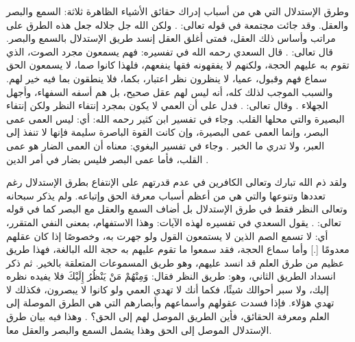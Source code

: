 وطرق الإستدلال التي هي من أسباب إدراك حقائق الأشياء الظاهرة ثلاثة: السمع والبصر والعقل. وقد جائت مجتمعة في قوله تعالى: \quranayah*[67][23]{\footnotesize \surahname*[67]}. ولكن الله جل جلاله جعل هذه الطرق على مراتب وأساس ذلك العقل، فمتى أغلق العقل إنسد طريق الإستدلال بالسمع والبصر. قال تعالى: 
\quranayah*[2][171]{\footnotesize \surahname*[2]}. قال السعدي رحمه الله في تفسيره: فهم يسمعون مجرد الصوت، الذي تقوم به عليهم الحجة، ولكنهم لا يفقهونه فقها ينفعهم، فلهذا كانوا صما، لا يسمعون الحق سماع فهم وقبول، عميا، لا ينظرون نظر اعتبار، بكما، فلا ينطقون بما فيه خير لهم. والسبب الموجب لذلك كله، أنه ليس لهم عقل صحيح، بل هم أسفه السفهاء، وأجهل الجهلاء \cite{tafsir_Saadi}. وقال تعالى: 
\quranayah*[22][46]{\footnotesize \surahname*[22]}. فدل على أن العمي لا يكون بمجرد إنتفاء النظر ولكن إنتفاء البصيرة والتي محلها القلب. وجاء في تفسير ابن كثير رحمه الله: أي: ليس العمى عمى البصر، وإنما العمى عمى البصيرة، وإن كانت القوة الباصرة سليمة فإنها لا تنفذ إلى العبر، ولا تدري ما الخبر \cite{tafsir_ibnKathir}. وجاء في تفسير البغوي: معناه أن العمى الضار هو عمى القلب، فأما عمى البصر فليس بضار في أمر الدين \cite{tafsir_Baghawi}. 

ولقد ذم الله تبارك وتعالى الكافرين في عدم قدرتهم على الإنتفاع بطرق الإستدلال رغم تعددها وتنوعها والتي هي من أعظم أسباب معرفة الحق وإتباعه. ولم يذكر سبحانه وتعالى النظر فقط في طرق الإستدلال بل أضاف السمع والعقل مع البصر كما في قوله تعالى: \quranayah*[10][42-43]{\footnotesize \surahname*[10]}. يقول السعدي في تفسيره لهذه الآيات: وهذا الاستفهام، بمعنى النفي المتقرر، أي: لا تسمع الصم الذين لا يستمعون القول ولو جهرت به، وخصوصًا إذا كان عقلهم معدومًا [.] وأما سماع الحجة، فقد سمعوا ما تقوم عليهم به حجة الله البالغة، فهذا طريق عظيم من طرق العلم قد انسد عليهم، وهو طريق المسموعات المتعلقة بالخير. ثم ذكر انسداد الطريق الثاني، وهو: طريق النظر فقال: {وَمِنْهُمْ مَنْ يَنْظُرُ إِلَيْكَ} فلا يفيده نظره إليك، ولا سبر أحوالك شيئًا، فكما أنك لا تهدي العمي ولو كانوا لا يبصرون، فكذلك لا تهدي هؤلاء. فإذا فسدت عقولهم وأسماعهم وأبصارهم التي هي الطرق الموصلة إلى العلم ومعرفة الحقائق، فأين الطريق الموصل لهم إلى الحق؟ \cite{tafsir_Saadi}. وهذا فيه بيان طرق الإستدلال الموصل إلى الحق وهذا يشمل السمع والبصر والعقل معا.

